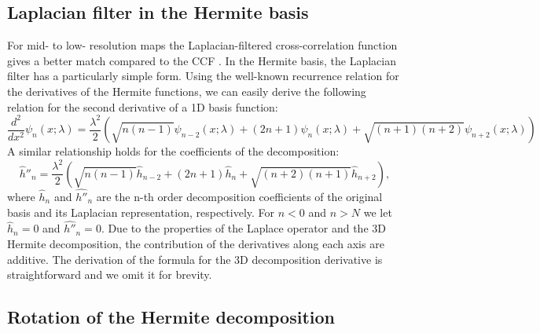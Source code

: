 \subsection{Laplacian filter in the Hermite basis}
For mid- to low- resolution maps the Laplacian-filtered cross-correlation function gives a better match compared to the CCF \cite{Wriggers2010}.
In the Hermite basis, the Laplacian filter has a particularly simple form.
Using the well-known recurrence relation for the derivatives of
the Hermite functions, we can easily derive the following relation for the second derivative of a 1D basis function:
\begin{equation}
 \frac{d^2}{d x^2}\psi_{n}(x; \lambda ) = \frac{\lambda^2}{2}\left( \sqrt{n(n-1)} \psi_{n-2}(x; \lambda ) + (2n+1)\psi_{n}(x; \lambda ) + \sqrt{(n+1)(n+2)} \psi_{n+2}(x; \lambda ) \right)
\end {equation}
A similar relationship holds for the coefficients of the decomposition: 
\begin{equation}
  \hat{h}''_{n} = \frac{\lambda^2}{2}\left(  \sqrt{n(n-1)} \hat{h}_{n-2} + (2n+1)\hat{h}_{n} + \sqrt{(n+2)(n+1)} \hat{h}_{n+2} \right)
  ,
\end {equation}
where $\hat{h}_{n}$ and $\hat{h''}_{n}$ are the n-th order decomposition coefficients of the original basis and its Laplacian representation,
respectively. For $n<0$ and $n>N$ we let $\hat{h}_{n} = 0$
and $\hat{h''}_{n} = 0$.
Due to the properties of the Laplace operator and the 3D Hermite decomposition, the contribution of the derivatives along each axis are additive. The derivation of the
formula for the 3D decomposition derivative is straightforward and we omit it for brevity.


\subsection{Rotation of the Hermite decomposition}

